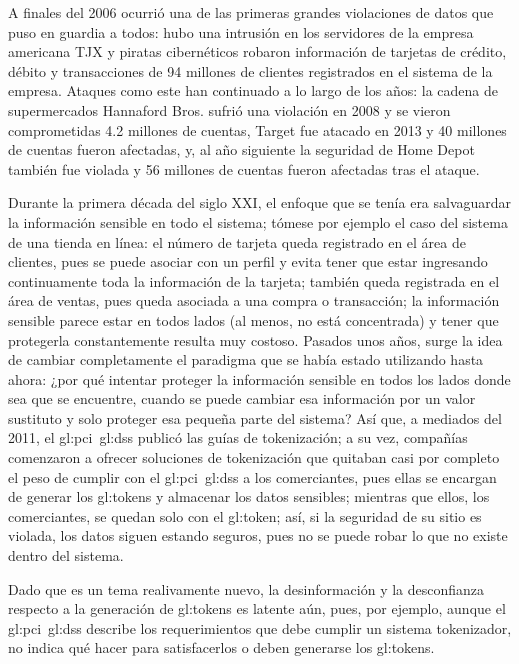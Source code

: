 A finales del 2006 ocurrió una de las primeras grandes violaciones de datos
que puso en guardia a todos: hubo una intrusión en los servidores de la empresa
americana TJX y piratas cibernéticos robaron información de tarjetas de crédito,
débito y transacciones de 94 millones de clientes registrados en el sistema de
la empresa. Ataques como este han continuado a lo largo de los años: la cadena
de supermercados Hannaford Bros. sufrió una violación en 2008 y se vieron
comprometidas 4.2 millones de cuentas, Target fue atacado en 2013 y 40 millones
de cuentas fueron afectadas, y, al año siguiente la seguridad de Home Depot
también fue violada y 56 millones de cuentas fueron afectadas tras el ataque.

Durante la primera década del siglo XXI, el enfoque que se tenía era
salvaguardar la información sensible en todo el sistema; tómese por ejemplo el
caso del sistema de una tienda en línea: el número de tarjeta queda registrado
en el área de clientes, pues se puede asociar con un perfil y evita tener que
estar ingresando continuamente toda la información de la tarjeta; también queda
registrada en el área de ventas, pues queda asociada a una compra o transacción;
la información sensible parece estar en todos lados (al menos, no está
concentrada) y tener que protegerla constantemente resulta muy costoso. Pasados
unos años, surge la idea de cambiar completamente el paradigma que se había
estado utilizando hasta ahora: ¿por qué intentar proteger la información
sensible en todos los lados donde sea que se encuentre, cuando se puede cambiar
esa información por un valor sustituto y solo proteger esa pequeña parte del
sistema? Así que, a mediados del 2011, el \gls{gl:pci}~\gls{gl:dss} publicó
las guías de tokenización; a su vez, compañías comenzaron a ofrecer soluciones
de tokenización que quitaban casi por completo el peso de cumplir con el
\gls{gl:pci}~\gls{gl:dss} a los comerciantes, pues ellas se encargan de generar
los \glspl{gl:token} y almacenar los datos sensibles; mientras que ellos,
los comerciantes, se quedan solo con el \gls{gl:token}; así, si la seguridad de
su sitio es violada, los datos siguen estando seguros, pues no se puede robar
lo que no existe dentro del sistema.

Dado que es un tema realivamente nuevo, la desinformación y la desconfianza
respecto a la generación de \glspl{gl:token} es latente aún, pues, por ejemplo,
aunque el \gls{gl:pci}~\gls{gl:dss} describe los requerimientos que debe cumplir
un sistema tokenizador, no indica qué hacer para satisfacerlos o deben generarse
los \glspl{gl:token}.


